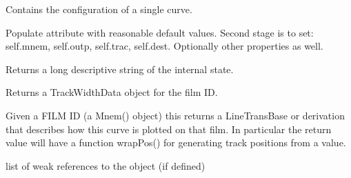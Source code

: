 \documentclass[letterpaper,10pt,english]{sphinxmanual}
\begin{document}
\begin{fulllineitems}
\label{\detokenize{ref/util/plot/PRESCfg:TotalDepth.util.plot.PRESCfg.CurveCfg}}
Contains the configuration of a single curve.

\begin{fulllineitems}
\label{\detokenize{ref/util/plot/PRESCfg:TotalDepth.util.plot.PRESCfg.CurveCfg.__init__}}
Populate attribute with reasonable default values.
Second stage is to set:
self.mnem, self.outp, self.trac, self.dest.
Optionally other properties as well.

\end{fulllineitems}


\begin{fulllineitems}
\label{\detokenize{ref/util/plot/PRESCfg:TotalDepth.util.plot.PRESCfg.CurveCfg.longStr}}
Returns a long descriptive string of the internal state.

\end{fulllineitems}


\begin{fulllineitems}
\label{\detokenize{ref/util/plot/PRESCfg:TotalDepth.util.plot.PRESCfg.CurveCfg.tracWidthData}}
Returns a TrackWidthData object for the film ID.

\end{fulllineitems}


\begin{fulllineitems}
\label{\detokenize{ref/util/plot/PRESCfg:TotalDepth.util.plot.PRESCfg.CurveCfg.tracValueFunction}}
Given a FILM ID (a Mnem() object) this returns a LineTransBase or
derivation that describes how this curve is plotted on that film.
In particular the return value will have a function wrapPos() for
generating track positions from a value.

\end{fulllineitems}


\begin{fulllineitems}
\label{\detokenize{ref/util/plot/PRESCfg:TotalDepth.util.plot.PRESCfg.CurveCfg.__weakref__}}
list of weak references to the object (if defined)

\end{fulllineitems}


\end{fulllineitems}
\end{document}
